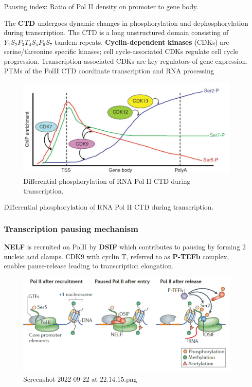 Pausing index: Ratio of Pol II density on promoter to gene body.

The \textbf{CTD} undergoes dynamic changes in phosphorylation and dephosphorylation during transcription. The CTD is a long unstructured domain consisting of \(Y_1S_2P_3T_4S_5P_6S_7\) tandem repeats. \textbf{Cyclin-dependent kinases} (CDKs) are serine/threonine specific kinases; cell cycle-associated CDKs regulate cell cycle progression. Transcription-associated CDKs are key regulators of gene expression. PTMs of the PolII CTD coordinate transcription and RNA processing

\begin{figure}
\centering
\includegraphics[width=\textwidth]{../_resources/Screenshot_2022-09-22_at_22-09-19.png}
\caption{Differential phosphorylation of RNA Pol II CTD during transcription.}
\end{figure}

Differential phosphorylation of RNA Pol II CTD during transcription.

\hypertarget{transcription-pausing-mechanism}{%
\subsubsection{Transcription pausing mechanism}\label{transcription-pausing-mechanism}}

\textbf{NELF} is recruited on PolII by \textbf{DSIF} which contributes to pausing by forming 2 nucleic acid clamps. CDK9 with cyclin T, referred to as \textbf{P-TEFb} complex, enables pause-release leading to transcription elongation.

\begin{figure}
\centering
\includegraphics[width=\textwidth]{../_resources/Screenshot_2022-09-22_at_22-14-15.png}
\caption{Screenshot 2022-09-22 at 22.14.15.png}
\end{figure}

